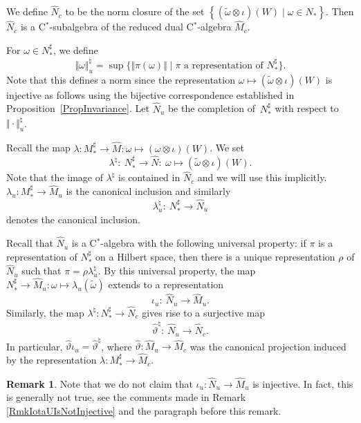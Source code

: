 \documentclass[pdftex]{sigma}
\numberwithin{equation}{section}
\theoremstyle{definition}
\newtheorem{rmk}[thm]{Remark}
\begin{document}
We def\/ine $\hat{N}_c$ to be the norm closure of the set $\left\{ (\tilde{\omega} \otimes \iota)(W) \mid \omega \in N_\ast \right\}$. Then $\hat{N}_c$ is a C$^\ast$-subalgebra of the reduced dual C$^\ast$-algebra $\hat{M}_c$.

 For $\omega \in N_\ast^\sharp$, we def\/ine
\[
    \Vert \omega \Vert_u^\natural = \sup \big\{ \Vert \pi(\omega) \Vert \mid \pi \textrm{ a representation of } N_\ast^\sharp  \big\}.
\]
Note that this def\/ines a norm since the representation $\omega \mapsto (\tilde{\omega} \otimes \iota)(W)$ is injective as follows using the bijective correspondence established in Proposition~\ref{PropInvariance}.
 Let $\hat{N}_u$ be the completion of~$N_\ast^\sharp$ with respect to~$\Vert \cdot \Vert_u^\natural$.



Recall the map $\lambda: M_\ast^\sharp \rightarrow \hat{M}: \omega \mapsto (\omega \otimes \iota)(W)$. We set
\[
\lambda^\natural: \ N_\ast^\sharp \rightarrow \hat{N}: \ \omega \mapsto (\tilde{\omega} \otimes \iota)(W).
\]
  Note that the image of $\lambda^\natural$ is contained in $\hat{N}_c$ and we will use this implicitly. $\lambda_u: M_\ast^\sharp \rightarrow \hat{M}_u$ is the canonical inclusion and similarly
\[
\lambda_u^\natural: \ N_\ast^\sharp \rightarrow \hat{N}_u
\]
 denotes the canonical inclusion.

Recall that $\hat{N}_u$ is a C$^\ast$-algebra with the following universal property: if $\pi$ is a representation of $N_\ast^\sharp$ on a Hilbert space, then there is a unique representation $\rho$ of $\hat{N}_u$ such that $\pi = \rho \lambda_u^\natural$.  By this universal property, the map $N_\ast^\sharp \rightarrow \hat{M}_u: \omega \mapsto \lambda_u(\tilde{\omega}) $ extends to a representation
\[
\iota_u: \ \hat{N}_u \rightarrow \hat{M}_u.
\]
  Similarly, the map $\lambda^\natural: N_\ast^\sharp \rightarrow \hat{N}_c$ gives rise to a surjective map
 \[
\hat{\vartheta}^\natural: \ \hat{N}_u \rightarrow \hat{N}_c.
\]
 In particular, $\hat{\vartheta} \iota_u = \hat{\vartheta}^\natural$, where $\hat{\vartheta}: \hat{M}_u \rightarrow \hat{M}_c$ was the canonical projection induced by the representation $\lambda: M_\ast^\sharp \rightarrow \hat{M}_c$.

\begin{rmk}
Note that we do not claim that $\iota_u: \hat{N}_u \rightarrow \hat{M}_u$ is injective. In fact, this is generally not true, see the comments made in Remark \ref{RmkIotaUIsNotInjective} and the paragraph before this remark.
\end{rmk}
\end{document}
